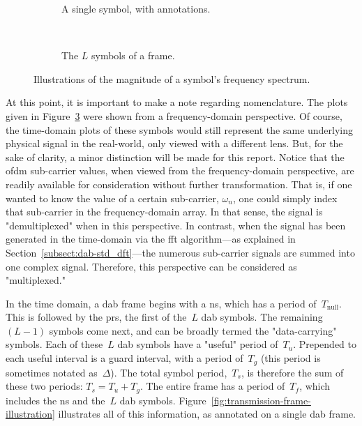 \documentclass[class=report,11pt,crop=false]{standalone}
\begin{document}
\begin{figure}[htbp]
    \centering
    \captionsetup{type=figure}
    \begin{subfigure}[t]{0.47\textwidth}
        \centering
        \def\svgwidth{1\linewidth}
        {\scriptsize
            }
        \caption{A single  symbol, with annotations.}
        \label{fig:dab-single-symbol-diagram}
    \end{subfigure}%
    ~ 
    \begin{subfigure}[t]{0.52\textwidth}
        \def\svgwidth{1\linewidth}
        {\scriptsize
            }
        \caption{The \(L\) symbols of a  frame.}
        \label{fig:dab-surface-diagram}
    \end{subfigure}
    \caption{Illustrations of the magnitude of a  symbol's frequency spectrum.}
    \label{ig:dab-symbol-diagrams}
\end{figure}

At this point, it is important to make a note regarding nomenclature. The plots given in Figure~\ref{ig:dab-symbol-diagrams} were shown from a frequency-domain perspective. Of course, the time-domain plots of these symbols would still represent the same underlying physical signal in the real-world, only viewed with a different lens. But, for the sake of clarity, a minor distinction will be made for this report. Notice that the \gls{ofdm} sub-carrier values, when viewed from the frequency-domain perspective, are readily available for consideration without further transformation. That is, if one wanted to know the value of a certain sub-carrier, \(\omega_n\), one could simply index that sub-carrier in the frequency-domain array. In that sense, the signal is "demultiplexed" when in this perspective. In contrast, when the signal has been generated in the time-domain via the \gls{fft} algorithm---as explained in Section~\ref{subsect:dab-std_dft}---the numerous sub-carrier signals are summed into one complex signal. Therefore, this perspective can be considered as "multiplexed."

In the time domain, a \gls{dab} frame begins with a \gls{ns}, which has a period of~\(T_\mathrm{null}\). This is followed by the \gls{prs}, the first of the~\(L\) \gls{dab} symbols. The remaining~\((L-1)\) symbols come next, and can be broadly termed the "data-carrying" symbols. Each of these~\(L\) \gls{dab} symbols have a "useful" period of~\(T_u\). Prepended to each useful interval is a guard interval, with a period of~\(T_g\) (this period is sometimes notated as~\(\Delta\)). The total symbol period,~\(T_s\), is therefore the sum of these two periods: \(T_s = T_u + T_g\). The entire frame has a period of~\(T_f\), which includes the \gls{ns} and the~\(L\) \gls{dab} symbols. Figure~\ref{fig:transmission-frame-illustration} illustrates all of this information, as annotated on a single \gls{dab} frame.
\end{document}
